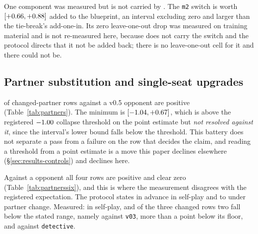One component was measured but is not carried by \sestina{}. The \texttt{m2} switch is worth
\vsevenAddInMtwo{} $[+0.66, +0.88]$ added to the blueprint, an interval
excluding zero and larger than the tie-break's add-one-in. Its zero leave-one-out drop was measured
on training material and is not re-measured here, because \sestina{} does not carry the switch and
the protocol directs that it not be added back; there is no leave-one-out cell for it and there could
not be.

\subsection{Partner substitution and single-seat upgrades}
\label{sec:results-partners}

\vsevenSonePositive{} of \vsevenSoneRows{} changed-partner rows against a v0.5 opponent are positive
(Table~\ref{tab:partners}). The minimum is
\vsevenSoneMin{} $[-1.04, +0.67]$, which is above the
registered $-1.00{}$ collapse threshold on the point estimate but \emph{not resolved
against it}, since the interval's lower bound falls below the threshold. This battery does not
separate a pass from a failure on the row that decides the claim, and reading a threshold from a
point estimate is a move this paper declines elsewhere (\S\ref{sec:results-controls}) and declines
here.

\begin{table}[!ht]\centering
\caption{Partner-regime table against a v0.5 opponent. Each row is the difference, in percentage
points of win-rate edge, between the edge of a team consisting of \sestina{} plus two copies of the
named partner and the edge of a team consisting of \vsix{} plus the same two partners, both against
three copies of the opponent; the interval is a between-cell contrast as in
\S\ref{sec:evaluation-intervals}. Per-bank values are given in bank order, 7090001 then 7090002.}
\label{tab:partners}
{\tabfont}
\end{table}

Against a \vsix{} opponent all four rows are positive and clear zero
(Table~\ref{tab:partnerssix}), and this is where the measurement disagrees with the registered
expectation. The protocol states in advance \vsevenTrainOppSixSelf{} in self-play and
\vsevenTrainOppSixLo{} to \vsevenTrainOppSixHi{} under partner change. Measured:
\vsevenOppSixItself{} in self-play, and of the three changed rows two fall below the stated range,
namely \vsevenOppSixVthree{} against \texttt{v03}, more than a point below its floor, and
\vsevenOppSixDetective{} against \texttt{detective}.

